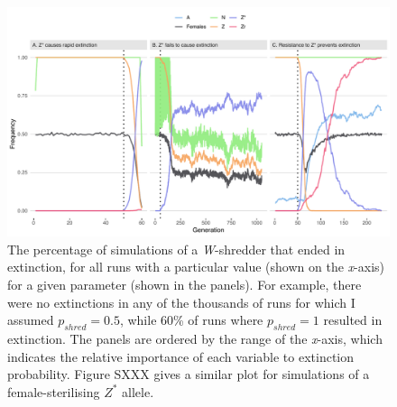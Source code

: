 \documentclass[]{rsos}%
\begin{document}
\begin{figure}[h]
\centering
\includegraphics[width=1.0\textwidth]{../figures/figure2.pdf}
\caption{\footnotesize{The percentage of simulations of a \textit{W}-shredder that ended in extinction, for all runs with a particular value (shown on the \textit{x}-axis) for a given parameter (shown in the panels). For example, there were no extinctions in any of the thousands of runs for which I assumed $p_{shred} = 0.5$, while 60\% of runs where $p_{shred} = 1$ resulted in extinction. The panels are ordered by the range of the \textit{x}-axis, which indicates the relative importance of each variable to extinction probability. Figure SXXX gives a similar plot for simulations of a female-sterilising $Z^*$ allele.}}
\end{figure}
\newpage
\end{document}
